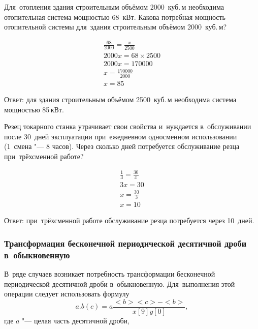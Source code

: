 \documentclass[]{scrartcl}
\begin{document}
\begin{Thexmpl}\label{ex:dir-prop}
	Для~отопления здания строительным объёмом 2000~куб.\,м необходима отопительная система мощностью 68~кВт. Какова потребная мощность отопительной системы для~здания строительным объёмом 2000~куб.\,м?
	
	\begin{equation*}\label{ex:-inv-prop}
	\begin{aligned}
	\frac{68}{2000}=\frac{x}{2500} \\
	2000x = 68\times 2500 \\
	2000x = 170000 \\
	x = \frac{170000}{2000} \\
	x = 85
	\end{aligned}
	\end{equation*}
	
	Ответ: для здания строительным объёмом 2500~куб.\,м необходима система мощностью 85\,кВт.
\end{Thexmpl}

\begin{Thexmpl}\label{ex:inv-prop}
Резец токарного станка утрачивает свои свойства и~нуждается в~обслуживании после 30~дней эксплуатации при~ежедневном односменном использовании (1~смена "--- 8 часов). Через сколько дней потребуется обслуживание резца при~трёхсменной работе?

\begin{equation*}\label{}
\begin{aligned}
\frac{1}{3}=\frac{30}{x} \\
3x = 30 \\
x = \frac{30}{3} \\
x = 10
\end{aligned}
\end{equation*}

Ответ: при~трёхсменной работе обслуживание резца потребуется через 10~дней.
\end{Thexmpl}

\subsubsection{Трансформация бесконечной периодической десятичной дроби в~обыкновенную}

В~ряде случаев возникает потребность трансформации бесконечной периодической десятичной дроби в~обыкновенную. Для~выполнения этой операции следует использовать формулу
\begin{equation}\label{eq:periodic-to-frac-1}
a.b(c)=a\frac{<b><c>-<b>}{x[9]y[0]},
\end{equation}
где $a$ "--- целая часть десятичной дроби,
\end{document}
